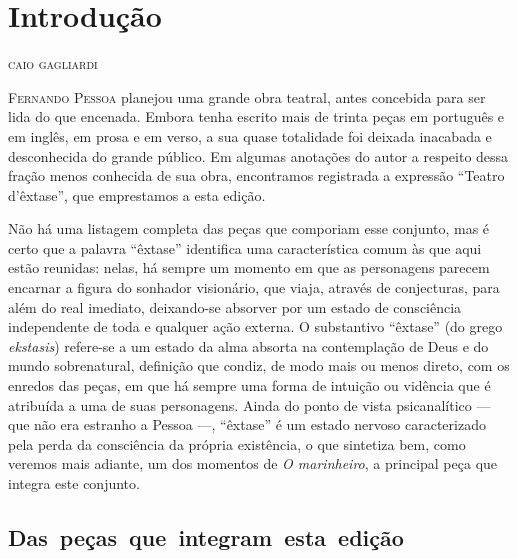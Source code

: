 \chapter[Introdução, \emph{por Caio Gagliardi}]{Introdução}

\begin{flushright}
\textsc{caio gagliardi}
\end{flushright}

\textsc{Fernando Pessoa} planejou uma grande obra teatral, antes concebida para
ser lida do que encenada. Embora tenha escrito mais de trinta peças em
português e em inglês, em prosa e em verso, a sua quase totalidade foi
deixada inacabada e desconhecida do grande público. Em algumas
anotações do autor a respeito dessa fração menos conhecida de sua obra,
encontramos registrada a expressão “Teatro d’êxtase”, que emprestamos a
esta edição. 

Não há uma listagem completa das peças que comporiam esse conjunto, mas é certo
que a palavra “êxtase” identifica uma característica comum às que aqui
estão reunidas: nelas, há sempre um momento em que as personagens
parecem encarnar a figura do sonhador visionário, que viaja, através de
conjecturas, para além do real imediato, deixando-se absorver por um
estado de consciência independente de toda e qualquer ação externa. O
substantivo “êxtase” (do grego \textit{ekstasis}) refere-se a um estado
da alma absorta na contemplação de Deus e do mundo sobrenatural,
definição que condiz, de modo mais ou menos direto, com os enredos das
peças, em que há sempre uma forma de intuição ou vidência que é
atribuída a uma de suas personagens. Ainda do ponto de vista
psicanalítico --- que não era estranho a Pessoa ---, “êxtase” é um estado
nervoso caracterizado pela perda da consciência da própria existência,
o que sintetiza bem, como veremos mais adiante, um dos momentos de
\textit{O marinheiro}, a principal peça que integra este conjunto.

\section{\mbox{Das peças que integram esta edição}}

